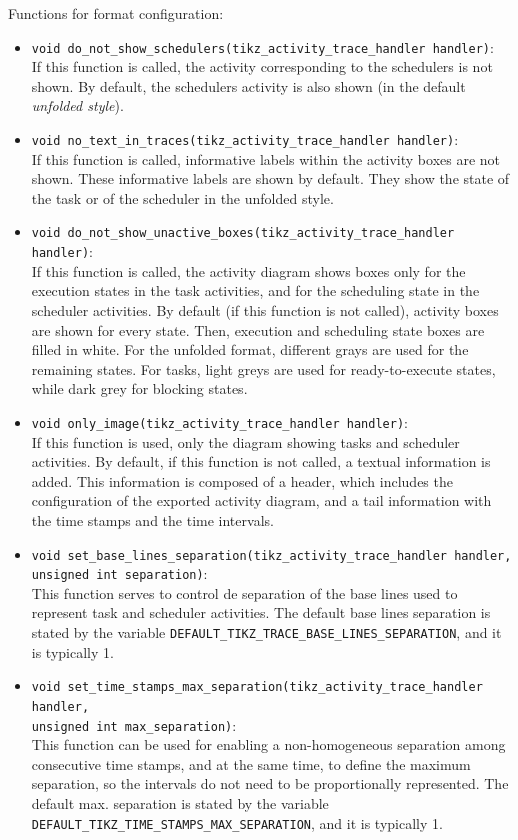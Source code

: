 Functions for format configuration:
\begin{itemize}
\item \texttt{void do\_not\_show\_schedulers(tikz\_activity\_trace\_handler handler)}:\\
If this function is called, the activity corresponding to the schedulers is not shown.
By default, the schedulers activity is also shown (in the default \emph{unfolded style}).

\item \texttt{void no\_text\_in\_traces(tikz\_activity\_trace\_handler handler)}:\\
If this function is called, informative labels within the activity boxes are not shown.
These informative labels are shown by default.
They show the state of the task or of the scheduler in the unfolded style.

\item \texttt{void do\_not\_show\_unactive\_boxes(tikz\_activity\_trace\_handler handler)}:\\
If this function is called, the activity diagram shows boxes only for the execution states
in the task activities, and for the scheduling state in the scheduler activities.
By default (if this function is not called), activity boxes are shown for every 
state.
Then, execution and scheduling state boxes are filled in white.
For the unfolded format, different grays are used for the remaining states.
For tasks, light greys are used for ready-to-execute states, while 
dark grey for blocking states.

\item \texttt{void only\_image(tikz\_activity\_trace\_handler handler)}:\\
If this function is used, only the diagram showing tasks and scheduler activities.
By default, if this function is not called, a textual information is added.
This information is composed of a header, which includes the configuration of the
exported activity diagram, 
and a tail information with the time stamps and the time intervals.

\item \texttt{void set\_base\_lines\_separation(tikz\_activity\_trace\_handler handler, unsigned int separation)}:\\
This function serves to control de separation of the base lines used to represent task and scheduler activities.
The default base lines separation is stated by the variable \texttt{DEFAULT\_TIKZ\_TRACE\_BASE\_LINES\_SEPARATION},
and it is typically 1.

\item \texttt{void set\_time\_stamps\_max\_separation(tikz\_activity\_trace\_handler handler,\\
 unsigned int max\_separation)}:\\
This function can be used for enabling a non-homogeneous separation among consecutive time stamps,
and at the same time, to define the maximum separation, so the intervals do not need to be proportionally represented.
The default max. separation is stated by the variable \texttt{DEFAULT\_TIKZ\_TIME\_STAMPS\_MAX\_SEPARATION},
and it is typically 1.
\end{itemize}


